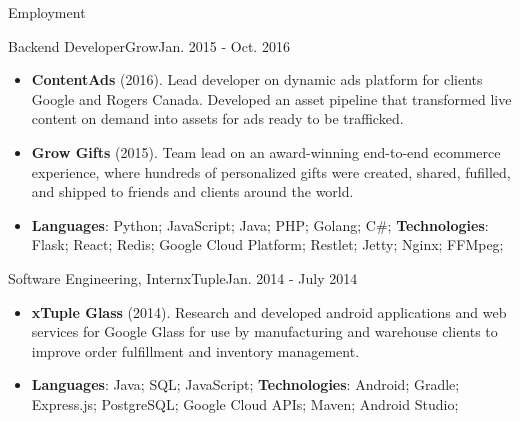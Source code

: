 \documentclass[]{mcdowellcv}
\begin{document}
\begin{cvsection}{Employment}
        \begin{cvsubsection}{Backend Developer}{Grow}{Jan. 2015 - Oct. 2016}
            \begin{itemize}
                \item \textbf{ContentAds} (2016). Lead developer on dynamic ads platform for clients Google and Rogers Canada. Developed an asset pipeline that transformed live content on demand into assets for ads ready to be trafficked.
            \end{itemize}
            \begin{itemize}
                \item \textbf{Grow Gifts} (2015). Team lead on an award-winning end-to-end ecommerce experience, where hundreds of personalized gifts were created, shared, fufilled, and shipped to friends and clients around the world.
            \end{itemize}
            \begin{itemize}
                 \item \textbf{Languages}: Python; JavaScript; Java; PHP; Golang; C\#; \newline
                \textbf{Technologies}: Flask; React; Redis; Google Cloud Platform; Restlet; Jetty; Nginx; FFMpeg;
            \end{itemize}
        \end{cvsubsection}

        \begin{cvsubsection}{Software Engineering, Intern}{xTuple}{Jan. 2014 - July 2014}
            \begin{itemize}
                \item \textbf{xTuple Glass} (2014). Research and developed android applications and web services for Google Glass for use by manufacturing and warehouse clients to improve order fulfillment and inventory management.
            \end{itemize}
            \begin{itemize}
                 \item \textbf{Languages}: Java; SQL; JavaScript; \newline
                \textbf{Technologies}: Android; Gradle; Express.js; PostgreSQL; Google Cloud APIs; Maven; Android Studio;
            \end{itemize}
        \end{cvsubsection}


\end{cvsection}
\end{document}
